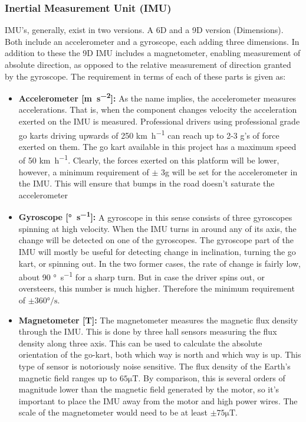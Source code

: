 \subsubsection*{Inertial Measurement Unit (IMU)}
\label{sec:imu}
IMU's, generally, exist in two versions.
A 6D and a 9D version (Dimensions).
Both include an accelerometer and a gyroscope, each adding three dimensions.
In addition to these the 9D IMU includes a magnetometer, enabling measurement of absolute direction, as opposed to the relative measurement of direction granted by the gyroscope.
The requirement in terms of each of these parts is given as:
\begin{itemize}
	\item \textbf{Accelerometer [\si{\metre\per\second^2}]:} As the name implies, the accelerometer measures accelerations.
	That is, when the component changes velocity the acceleration exerted on the IMU is measured.
	Professional drivers using professional grade go karts driving upwards of 250 \si{\kilo\metre\per\hour} can reach up to 2-3 g's of force exerted on them.
	The go kart available in this project has a maximum speed of 50 \si{\kilo\metre\per\hour}.
	Clearly, the forces exerted on this platform will be lower, however, a minimum requirement of $\pm$ 3g will be set for the accelerometer in the IMU.
	This will ensure that bumps in the road doesn't saturate the accelerometer
	\item \textbf{Gyroscope [\si{\degree\per\second}]:} 
	A gyroscope in this sense consists of three gyroscopes spinning at high velocity.
	When the IMU turns in around any of its axis, the change will be detected on one of the gyroscopes. 
	The gyroscope part of the IMU will mostly be useful for detecting change in inclination, turning the go kart, or spinning out.
	In the two former cases, the rate of change is fairly low, about 90 \si{\degree\per\second} for a sharp turn. 
	But in case the driver spins out, or oversteers, this number is much higher. 
	Therefore the minimum requirement of $\pm 360 \si{\degree\per\second}$.
	\item \textbf{Magnetometer [\si{\tesla}]:} 
	The magnetometer measures the magnetic flux density through the IMU.
	This is done by three hall sensors measuring the flux density along three axis. 
	This can be used to calculate the absolute orientation of the go-kart, both which way is north and which way is up.
	This type of sensor is notoriously noise sensitive.
	The flux density of the Earth's magnetic field ranges up to $65 \si{\micro\tesla}$.
	By comparison, this is several orders of magnitude lower than the magnetic field generated by the motor, so it's important to place the IMU away from the motor and high power wires.
	The scale of the magnetometer would need to be at least $\pm 75 \si{\micro \tesla}$.
\end{itemize}
